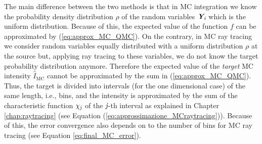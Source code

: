 The main difference between the two methods is that in MC integration we know the probability density distribution $\rho$ of the random variables $\textit{\textbf{Y}}_{\textit{i}}$ which is the uniform distribution. Because of this, the expected value of the function $f$ can be approximated by (\ref{eq:approx_MC_QMC}). On the contrary, in MC ray tracing we consider random variables equally distributed with a uniform distribution $\rho$ at the source but, applying ray tracing to these variables, we do not know the target probability distribution anymore. Therefore the expected value of the \textit{target} MC intensity $\hat{I}_{\textrm{MC}}$ cannot be approximated by the sum in (\ref{eq:approx_MC_QMC}). Thus, the target is divided into intervals (for the one dimensional case) of the same length, i.e., bins, and the intensity is approximated by the sum of the characteristic function $\chi_{\textit{j}}$ of the $\textit{j}$-th interval as explained in Chapter \ref{chap:raytracing} (see Equation (\ref{eq:approssimazione_MCraytracing})). Because of this, the error convergence also depends on to the number of bins for MC ray tracing (see Equation \ref{eq:final_MC_error}).










